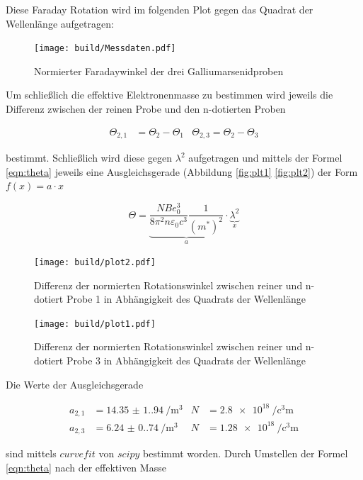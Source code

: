 Diese Faraday Rotation wird im folgenden Plot gegen das Quadrat der Wellenlänge
aufgetragen:

\begin{figure}[H]
	\centering
	\texttt{[image: build/Messdaten.pdf]}
	\caption{Normierter Faradaywinkel der drei Galliumarsenidproben}\label{fig:Aufbau}
\end{figure}

Um schließlich die effektive Elektronenmasse zu bestimmen wird jeweils die
Differenz zwischen der reinen Probe und den n-dotierten Proben

\begin{align*}
	\Theta_{2,1} & =\Theta_2-\Theta_1 & \Theta_{2,3}=\Theta_2-\Theta_3
\end{align*}

bestimmt. Schließlich wird diese gegen $\lambda^2$ aufgetragen und mittels der
Formel \eqref{eqn:theta} jeweils eine Ausgleichsgerade (Abbildung
\eqref{fig:plt1} \eqref{fig:plt2}) der Form $f(x)=a\cdot x$

\begin{equation}
	\Theta=\underbrace{\frac{NBe_0^3}{8 \pi^2 n \varepsilon_0 c^3} \frac{1}{(m^{\ast})^2}}_{a} \cdot \underbrace{\lambda^2}_{x}
	\label{eqn:theta}
\end{equation}

\begin{figure}[H]
	\centering
	\texttt{[image: build/plot2.pdf]}
	\caption{Differenz der normierten Rotationswinkel zwischen reiner und n-dotiert Probe 1 in Abhängigkeit des Quadrats der Wellenlänge}\label{fig:plt1}
\end{figure}

\begin{figure}[H]
	\centering
	\texttt{[image: build/plot1.pdf]}
	\caption{Differenz der normierten Rotationswinkel zwischen reiner und n-dotiert Probe 3 in Abhängigkeit des Quadrats der Wellenlänge}\label{fig:plt2}
\end{figure}

Die Werte der Ausgleichsgerade

\begin{align}
	a_{2,1} & =\qty{14.35(1.94)}{\per\cubic\meter} & N & =\qty{2.8e18}{\per\cubic\centi\meter}  \\
	a_{2,3} & =\qty{6.24(0.74)}{\per\cubic\meter}  & N & =\qty{1.28e18}{\per\cubic\centi\meter}
\end{align}

sind mittels $curvefit$ von $scipy$ \cite{scipy} bestimmt worden. Durch
Umstellen der Formel \eqref{eqn:theta} nach der effektiven Masse

